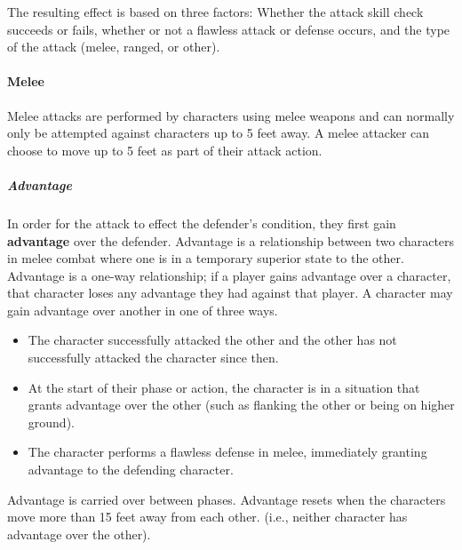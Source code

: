 \documentclass[11pt]{article}
\begin{document}
The resulting effect is based on three factors: Whether the attack skill check succeeds or fails, whether or not a flawless attack or defense occurs, and the type of the attack (melee, ranged, or other).

\paragraph{Melee}

Melee attacks are performed by characters using melee weapons and can normally only be attempted against characters up to 5 feet away. A melee attacker can choose to move up to 5 feet as part of their attack action.

\subparagraph{Advantage}
In order for the attack to effect the defender's condition, they first gain \textbf{advantage} over the defender. Advantage is a relationship between two characters in melee combat where one is in a temporary superior state to the other.
Advantage is a one-way relationship; if a player gains advantage over a character, that character loses any advantage they had against that player.
A character may gain advantage over another in one of three ways.

\begin{itemize}
	\item The character successfully attacked the other and the other has not successfully attacked the character since then.
	\item At the start of their phase or action, the character is in a situation that grants advantage over the other (such as flanking the other or being on higher ground).
	\item The character performs a flawless defense in melee, immediately granting advantage to the defending character.
\end{itemize}

Advantage is carried over between phases. Advantage resets when the characters move more than 15 feet away from each other. (i.e., neither character has advantage over the other).
\end{document}
